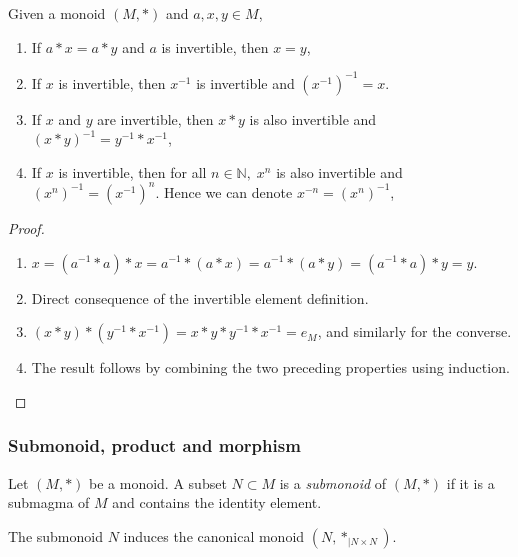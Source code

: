 \documentclass[12pt]{report}
\begin{document}
\begin{proposition}
    Given a monoid $(M, \ast)$ and $a, x, y \in M$,
    \begin{enumerate}[label=(\roman*)]
        \item If $a \ast x = a \ast y$ and $a$ is invertible, then $x = y$,
        \item If $x$ is invertible, then $x^{-1}$ is invertible and $(x^{-1})^{-1} = x$.
        \item If $x$ and $y$ are invertible, then $x \ast y$ is also invertible and $(x \ast y)^{-1} = y^{-1} \ast x^{-1}$,
        \item If $x$ is invertible, then for all $n \in \mathbb{N}, \; x^n$ is also invertible and $(x^n)^{-1} = (x^{-1})^n$. Hence we can denote $x^{-n} = (x^n)^{-1}$,
    \end{enumerate}
\end{proposition}

\begin{proof}
    \begin{enumerate}[label=(\roman*)]
        \item $x = (a^{-1} \ast a) \ast x = a^{-1} \ast (a \ast x) = a^{-1} \ast (a \ast y) = (a^{-1} \ast a) \ast y = y$.
        \item Direct consequence of the invertible element definition.
        \item $(x \ast y) \ast (y^{-1} \ast x^{-1}) = x \ast y \ast y^{-1} \ast x^{-1} = e_M$, and similarly for the converse.
        \item The result follows by combining the two preceding properties using induction.
    \end{enumerate}
\end{proof}

\subsubsection{Submonoid, product and morphism}

\begin{definition} \label{def-monoid-submonoid}
    Let $(M, \ast)$ be a monoid. A subset $N \subset M$ is a \emph{submonoid} of $(M, \ast)$ if it is a submagma of $M$ and contains the identity element.
\end{definition}

\begin{remark} \label{rem-monoid-canonical-submonoid}
    The submonoid $N$ induces the canonical monoid $(N, \ast_{\vert N \times N})$.
\end{remark}
\end{document}
